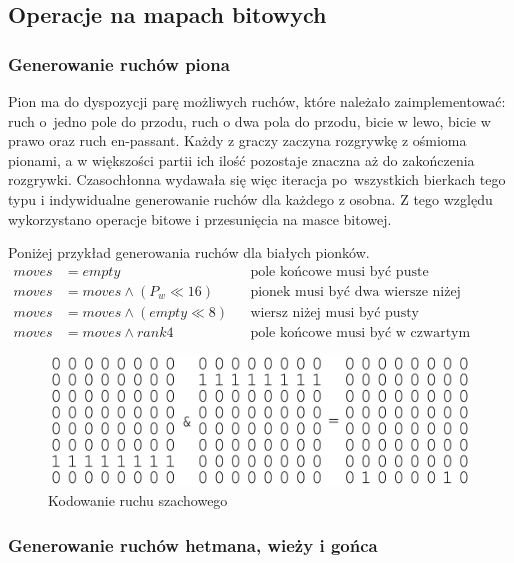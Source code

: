 \subsection{Operacje na mapach bitowych}
\label{subsec:operacje-na-mapach-bitowych}

\subsubsection{Generowanie ruchów piona}

Pion ma do dyspozycji parę możliwych ruchów, które należało zaimplementować: ruch o~jedno pole do przodu, ruch o dwa pola do przodu, bicie w lewo, bicie w prawo oraz ruch en-passant.
Każdy z graczy zaczyna rozgrywkę z ośmioma pionami, a w większości partii ich ilość pozostaje znaczna aż do zakończenia rozgrywki.
Czasochłonna wydawała się więc iteracja po~wszystkich bierkach tego typu i indywidualne generowanie ruchów dla każdego z osobna.
Z tego względu wykorzystano operacje bitowe i przesunięcia na masce bitowej.

Poniżej przykład generowania ruchów dla białych pionków.
\begin{align*}
    moves & = empty && \text{pole końcowe musi być puste} \\
    moves & = moves \wedge (P_w\ll16) && \text{pionek musi być dwa wiersze niżej}\\
    moves & = moves \wedge (empty\ll8) && \text{wiersz niżej musi być pusty}\\
    moves & = moves \wedge rank4 && \text{pole końcowe musi być w czwartym wierszu}
\end{align*}

\begin{figure}[ht]
    \centering
    \includegraphics[width=0.85\linewidth]{rozdzialy/rozdzial01/3_generowanie-ruchow/rysunki/bitboards-arithmetic}
    \caption{Kodowanie ruchu szachowego}
    \label{fig:bitboards-arithmetic}
\end{figure}


\subsubsection{Generowanie ruchów hetmana, wieży i gońca}

